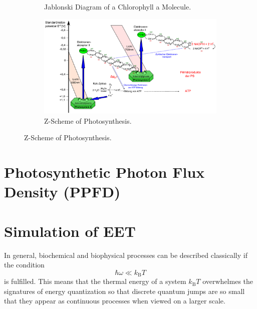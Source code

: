 \documentclass[9pt]{report}
\begin{document}
\begin{figure}[H]
\begin{subfigure}[b]{0.49\textwidth}
    	\caption{Jablonski Diagram of a Chlorophyll a Molecule.}
    \end{subfigure}
    \hfill
    \begin{subfigure}[b]{0.49\textwidth}
    	\centering
    	\includegraphics[width=\textwidth]{Z-Schema.pdf}
    	\caption{Z-Scheme of Photosynthesis.}
    \end{subfigure}
\end{figure}




\section{Photosynthetic Photon Flux Density (PPFD)}




\section{Simulation of EET}

In general, biochemical and biophysical processes can be described classically if the condition
\begin{equation}
\hbar\omega \ll k_{\mathrm{B}}T
\end{equation}
is fulfilled. This means that the thermal energy of a system $k_{\mathrm{B}}T$ overwhelmes the signatures of energy quantization so that discrete quantum jumps are so small that they appear as continuous processes when viewed on a larger scale.
\end{document}
